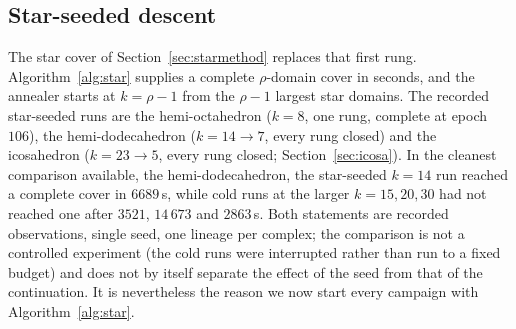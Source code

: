 \documentclass[12pt]{article}
\begin{document}
\subsection{Star-seeded descent}

The star cover of Section~\ref{sec:starmethod} replaces that first
rung.  Algorithm~\ref{alg:star} supplies a complete $\rho$-domain cover
in seconds, and the annealer starts at $k=\rho-1$ from the $\rho-1$
largest star domains.  The recorded star-seeded runs are the hemi-octahedron
($k=8$, one rung, complete at epoch $106$), the hemi-dodecahedron
($k=14\to7$, every rung closed) and the icosahedron
($k=23\to5$, every rung closed; Section~\ref{sec:icosa}).  In the cleanest
comparison available, the hemi-dodecahedron, the star-seeded $k=14$ run
reached a complete cover in $6689$\,s, while cold runs at the larger
$k=15,20,30$ had not reached one after $3521$, $14\,673$ and $2863$\,s.
Both statements are recorded observations, single seed, one lineage per
complex; the comparison is not a controlled experiment (the cold runs
were interrupted rather than run to a fixed budget) and does not by
itself separate the effect of the seed from that of the continuation.
It is nevertheless the reason we now start every campaign with
Algorithm~\ref{alg:star}.
\end{document}
